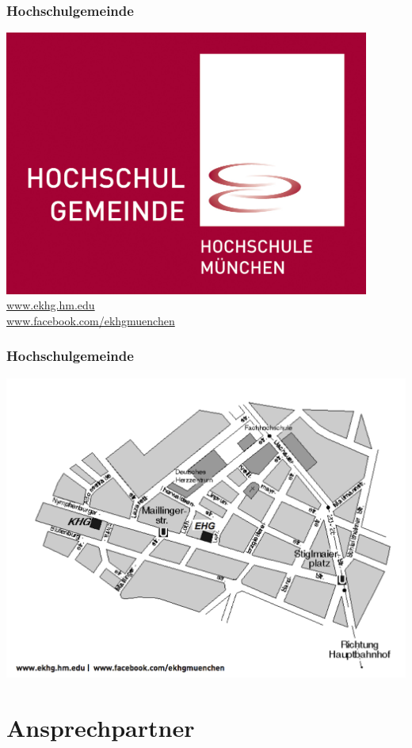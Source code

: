 \documentclass{beamer}
\begin{document}
    \begin{frame} 
    	\frametitle{Hochschulgemeinde}
    	\includegraphics[width=0.9\textwidth]{ekhg.jpg}
    	\\
		\url{www.ekhg.hm.edu}
		\\
		\url{www.facebook.com/ekhgmuenchen}
    \end{frame}
    
    \begin{frame} 
    	\frametitle{Hochschulgemeinde}
    	\includegraphics[width=1\textwidth]{anfahrt-ekhg.png}
    \end{frame}
    
    \section{Ansprechpartner}
    
\end{document}
